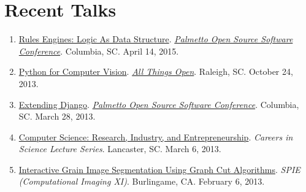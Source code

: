 \documentclass[10pt]{article}
\begin{document}
\section{Recent Talks}
{\footnotesize
\begin{enumerate}[align=left,labelsep=0em]
\renewcommand{\labelenumi}{[\arabic{enumi}]}
\item \href{http://www.malloc47.com/posscon2015/}{Rules Engines: Logic As Data Structure}. \emph{\href{http://posscon.org/}{Palmetto Open Source Software Conference}}. Columbia, SC. April 14, 2015.
\item \href{http://www.malloc47.com/ato2013/}{Python for Computer Vision}. \emph{\href{http://allthingsopen.org/}{All Things Open}}. Raleigh, SC. October 24, 2013.
\item \href{http://www.malloc47.com/posscon2013/}{Extending Django}. \emph{\href{http://posscon.org/}{Palmetto Open Source Software Conference}}.  Columbia, SC.  March 28, 2013.
\item \href{http://www.malloc47.com/cs-careers/}{Computer Science: Research, Industry, and Entrepreneurship}.  \emph{Careers in Science Lecture Series}.  Lancaster, SC.  March 6, 2013.
\item \href{http://www.malloc47.com/spie2013/}{Interactive Grain Image Segmentation Using Graph Cut Algorithms}.  \emph{SPIE (Computational Imaging XI)}.  Burlingame, CA.  February 6, 2013.
\end{enumerate} }
\end{document}
